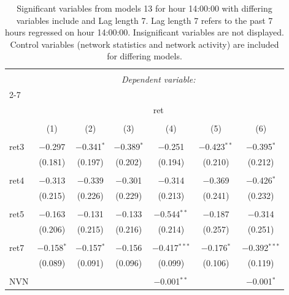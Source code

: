 
\begin{table}[!htbp] \centering 
  \caption{Significant variables from models 13 for hour 14:00:00 with differing variables include 
                               and Lag length 7. Lag length 7 refers to the past 7 hours regressed on hour 14:00:00. 
                               Insignificant variables are not displayed. 
                               Control variables (network statistics and network activity) are 
                               included for differing models.} 
  \label{RVmodels1_t_hourlagged1} 
\scriptsize 
\begin{tabular}{@{\extracolsep{5pt}}lcccccc} 
\\[-1.8ex]\hline 
\hline \\[-1.8ex] 
 & \multicolumn{6}{c}{\textit{Dependent variable:}} \\ 
\cline{2-7} 
\\[-1.8ex] & \multicolumn{6}{c}{ret} \\ 
\\[-1.8ex] & (1) & (2) & (3) & (4) & (5) & (6)\\ 
\hline \\[-1.8ex] 
 ret3 & $-$0.297 & $-$0.341$^{*}$ & $-$0.389$^{*}$ & $-$0.251 & $-$0.423$^{**}$ & $-$0.395$^{*}$ \\ 
  & (0.181) & (0.197) & (0.202) & (0.194) & (0.210) & (0.212) \\ 
  & & & & & & \\ 
 ret4 & $-$0.313 & $-$0.339 & $-$0.301 & $-$0.314 & $-$0.369 & $-$0.426$^{*}$ \\ 
  & (0.215) & (0.226) & (0.229) & (0.213) & (0.241) & (0.232) \\ 
  & & & & & & \\ 
 ret5 & $-$0.163 & $-$0.131 & $-$0.133 & $-$0.544$^{**}$ & $-$0.187 & $-$0.314 \\ 
  & (0.206) & (0.215) & (0.216) & (0.214) & (0.257) & (0.251) \\ 
  & & & & & & \\ 
 ret7 & $-$0.158$^{*}$ & $-$0.157$^{*}$ & $-$0.156 & $-$0.417$^{***}$ & $-$0.176$^{*}$ & $-$0.392$^{***}$ \\ 
  & (0.089) & (0.091) & (0.096) & (0.099) & (0.106) & (0.119) \\ 
  & & & & & & \\ 
 NVN &  &  &  & $-$0.001$^{**}$ &  & $-$0.001$^{*}$ \\ 

\end{tabular}
\end{table}
